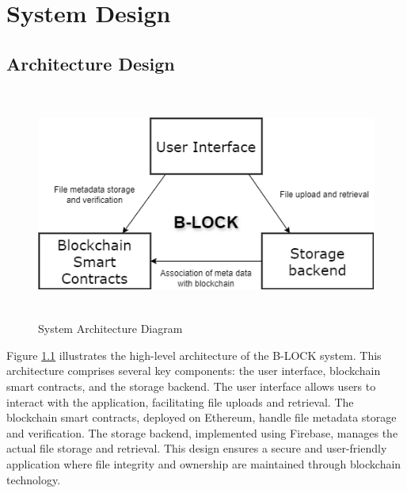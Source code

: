 \documentclass[12pt,a4paper]{report}
\begin{document}
\chapter{System Design}
\section{Architecture Design}
\begin{figure}[hbtp]
\centering
\includegraphics[width=5.5in,height=3in]{./pic/architecture.drawio.png}
\caption{System Architecture Diagram}
\label{fig:architecture}
\end{figure}
Figure \ref{fig:architecture} illustrates the high-level architecture of the B-LOCK system. This architecture comprises several key components: the user interface, blockchain smart contracts, and the storage backend. The user interface allows users to interact with the application, facilitating file uploads and retrieval. The blockchain smart contracts, deployed on Ethereum, handle file metadata storage and verification. The storage backend, implemented using Firebase, manages the actual file storage and retrieval. This design ensures a secure and user-friendly application where file integrity and ownership are maintained through blockchain technology.
\end{document}
